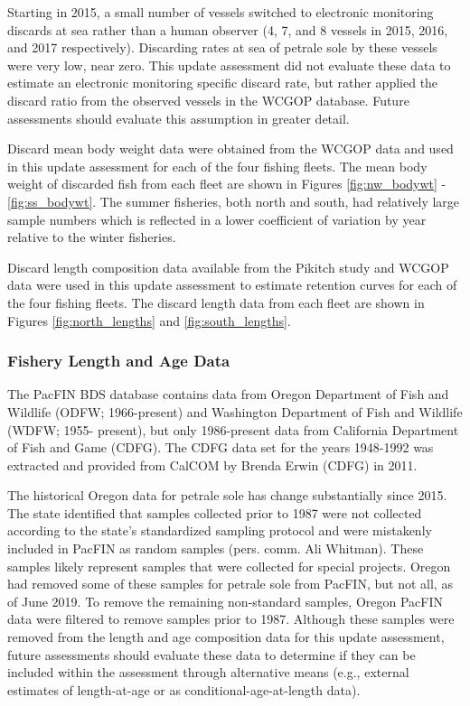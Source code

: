 \documentclass[12pt,]{article}
\begin{document}
Starting in 2015, a small number of vessels switched to electronic
monitoring discards at sea rather than a human observer (4, 7, and 8
vessels in 2015, 2016, and 2017 respectively). Discarding rates at sea
of petrale sole by these vessels were very low, near zero. This update
assessment did not evaluate these data to estimate an electronic
monitoring specific discard rate, but rather applied the discard ratio
from the observed vessels in the WCGOP database. Future assessments
should evaluate this assumption in greater detail.

Discard mean body weight data were obtained from the WCGOP data and used
in this update assessment for each of the four fishing fleets. The mean
body weight of discarded fish from each fleet are shown in Figures
\ref{fig:nw_bodywt} - \ref{fig:ss_bodywt}. The summer fisheries, both
north and south, had relatively large sample numbers which is reflected
in a lower coefficient of variation by year relative to the winter
fisheries.

Discard length composition data available from the Pikitch study and
WCGOP data were used in this update assessment to estimate retention
curves for each of the four fishing fleets. The discard length data from
each fleet are shown in Figures \ref{fig:north_lengths} and
\ref{fig:south_lengths}.

\subsubsection{Fishery Length and Age
Data}\label{fishery-length-and-age-data}

The PacFIN BDS database contains data from Oregon Department of Fish and
Wildlife (ODFW; 1966-present) and Washington Department of Fish and
Wildlife (WDFW; 1955- present), but only 1986-present data from
California Department of Fish and Game (CDFG). The CDFG data set for the
years 1948-1992 was extracted and provided from CalCOM by Brenda Erwin
(CDFG) in 2011.

The historical Oregon data for petrale sole has change substantially
since 2015. The state identified that samples collected prior to 1987
were not collected according to the state's standardized sampling
protocol and were mistakenly included in PacFIN as random samples (pers.
comm. Ali Whitman). These samples likely represent samples that were
collected for special projects. Oregon had removed some of these samples
for petrale sole from PacFIN, but not all, as of June 2019. To remove
the remaining non-standard samples, Oregon PacFIN data were filtered to
remove samples prior to 1987. Although these samples were removed from
the length and age composition data for this update assessment, future
assessments should evaluate these data to determine if they can be
included within the assessment through alternative means (e.g., external
estimates of length-at-age or as conditional-age-at-length data).
\end{document}
